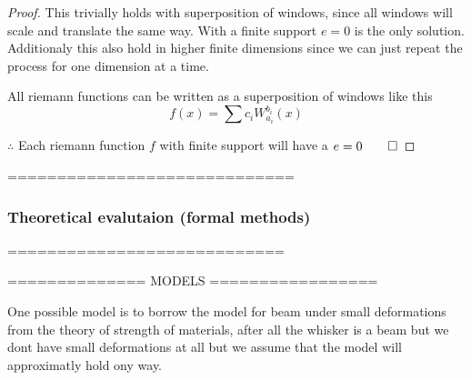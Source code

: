 \begin{proof}
    This trivially holds with superposition of windows, since all windows will scale and translate the same way. 
    With a finite support $e=0$ is the only solution. Additionaly this also hold in higher finite dimensions since we can just repeat the process for one dimension at a time.
    
    All riemann functions can be written as a superposition of windows like this
    \begin{equation}
        f(x)=\sum{c_iW_{a_i}^{b_i}(x)}
    \end{equation}

    $\therefore$ Each riemann function $f$ with finite support will have a $e=0\qed$

\end{proof}

=============================

\subsubsection{ Theoretical evalutaion (formal methods)}

============================

============== MODELS =================

One possible model is to borrow the model for beam under small 
deformations from the theory of strength of materials,
after all the whisker is a beam but we dont have small 
deformations at all but we assume that the model will approximatly hold ony way.


